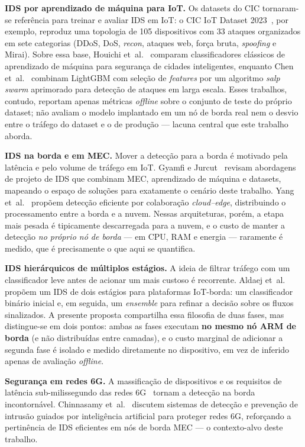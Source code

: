 \documentclass[12pt]{article}
\begin{document}
\textbf{IDS por aprendizado de máquina para IoT.} Os datasets do CIC tornaram-se
referência para treinar e avaliar IDS em IoT: o CIC IoT Dataset
2023~\cite{neto:23}, por exemplo, reproduz uma topologia de 105 dispositivos com
33 ataques organizados em sete categorias (DDoS, DoS, \textit{recon}, ataques
web, força bruta, \textit{spoofing} e Mirai). Sobre essa base, Houichi
et~al.~\cite{houichi:25} comparam classificadores clássicos de aprendizado de
máquina para segurança de cidades inteligentes, enquanto Chen
et~al.~\cite{chen:24} combinam LightGBM com seleção de \textit{features} por um
algoritmo \textit{salp swarm} aprimorado para detecção de ataques em larga
escala. Esses trabalhos, contudo, reportam apenas métricas \textit{offline}
sobre o conjunto de teste do próprio dataset; não avaliam o modelo implantado em
um nó de borda real nem o desvio entre o tráfego do dataset e o de produção —
lacuna central que este trabalho aborda.

\textbf{IDS na borda e em MEC.} Mover a detecção para a borda é motivado pela
latência e pelo volume de tráfego em IoT. Gyamfi e Jurcut~\cite{gyamfi:22}
revisam abordagens de projeto de IDS que combinam MEC, aprendizado de máquina e
datasets, mapeando o espaço de soluções para exatamente o cenário deste
trabalho. Yang et~al.~\cite{yang:23} propõem detecção eficiente por colaboração
\textit{cloud--edge}, distribuindo o processamento entre a borda e a nuvem.
Nessas arquiteturas, porém, a etapa mais pesada é tipicamente descarregada para
a nuvem, e o custo de manter a detecção \textit{no próprio nó de borda} — em CPU,
RAM e energia — raramente é medido, que é precisamente o que aqui se quantifica.

\textbf{IDS hierárquicos de múltiplos estágios.} A ideia de filtrar tráfego com
um classificador leve antes de acionar um mais custoso é recorrente. Aldaej
et~al.~\cite{aldaej:24} propõem um IDS de dois estágios para plataformas
IoT-borda: um classificador binário inicial e, em seguida, um \textit{ensemble}
para refinar a decisão sobre os fluxos sinalizados. A presente proposta
compartilha essa filosofia de duas fases, mas distingue-se em dois pontos: ambas
as fases executam \textbf{no mesmo nó ARM de borda} (e não distribuídas entre
camadas), e o custo marginal de adicionar a segunda fase é isolado e medido
diretamente no dispositivo, em vez de inferido apenas de avaliação
\textit{offline}.

\textbf{Segurança em redes 6G.} A massificação de dispositivos e os requisitos
de latência sub-milissegundo das redes 6G~\cite{you:21} tornam a detecção na
borda incontornável. Chinnasamy et~al.~\cite{chinnasamy:25} discutem sistemas de
detecção e prevenção de intrusão guiados por inteligência artificial para
proteger redes 6G, reforçando a pertinência de IDS eficientes em nós de borda
MEC — o contexto-alvo deste trabalho.
\end{document}
